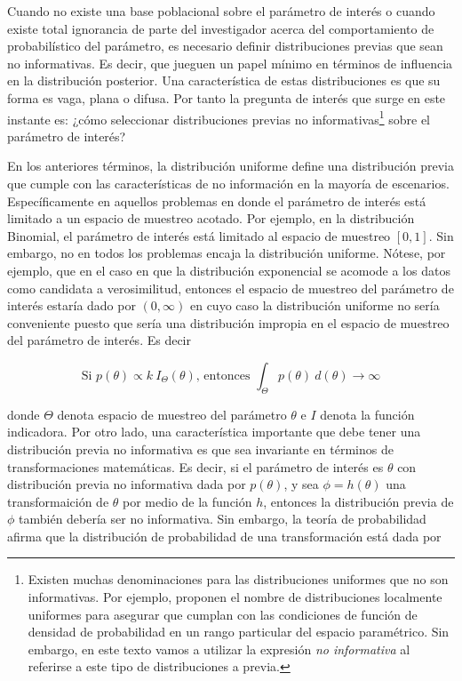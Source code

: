 \documentclass[
  10pt,
  spanish,
]{book}
\theoremstyle{definition}
\theoremstyle{definition}
\theoremstyle{definition}
\theoremstyle{definition}
\theoremstyle{remark}
\begin{document}
Cuando no existe una base poblacional sobre el parámetro de interés o
cuando existe total ignorancia de parte del investigador acerca del
comportamiento de probabilístico del parámetro, es necesario definir
distribuciones previas que sean no informativas. Es decir, que jueguen un papel mínimo en términos de
influencia en la distribución posterior. Una característica de
estas distribuciones es que su forma es vaga, plana o difusa.
Por tanto la pregunta de interés que surge en este instante es: ¿cómo
seleccionar distribuciones previas no
informativas\footnote{Existen muchas denominaciones para las distribuciones uniformes que no son informativas. Por ejemplo, \citet{BoxTiao} proponen el nombre de distribuciones localmente uniformes para asegurar que cumplan con las condiciones de función de densidad de probabilidad en un rango particular del espacio paramétrico. Sin embargo, en este texto vamos a utilizar la expresión \emph{no informativa} al referirse a este tipo de distribuciones a previa.}
sobre el parámetro de interés?

En los anteriores términos, la distribución uniforme define una
distribución previa que cumple con las características de no
información en la mayoría de escenarios. Específicamente en aquellos
problemas en donde el parámetro de interés está limitado a un espacio de
muestreo acotado. Por ejemplo, en la distribución Binomial, el parámetro
de interés está limitado al espacio de muestreo \([0,1]\). Sin embargo, no
en todos los problemas encaja la distribución uniforme. Nótese, por
ejemplo, que en el caso en que la distribución exponencial se acomode a
los datos como candidata a verosimilitud, entonces el espacio de
muestreo del parámetro de interés estaría dado por \((0,\infty)\) en cuyo
caso la distribución uniforme no sería conveniente puesto que sería una
distribución impropia en el espacio de muestreo del parámetro de
interés. Es decir

\begin{equation*}
\text{Si } p(\theta)\propto k\ I_{\Theta}(\theta) \text{, entonces } \int_{\Theta}p(\theta) \ d(\theta)\longrightarrow \infty
\end{equation*}

donde \(\Theta\) denota espacio de muestreo del parámetro \(\theta\) e \(I\)
denota la función indicadora. Por otro lado, una característica
importante que debe tener una distribución previa no informativa
es que sea invariante en términos de transformaciones matemáticas. Es
decir, si el parámetro de interés es \(\theta\) con distribución
previa no informativa dada por \(p(\theta)\), y sea
\(\phi=h(\theta)\) una transformaición de \(\theta\) por medio de la función
\(h\), entonces la distribución previa de \(\phi\) también debería
ser no informativa. Sin embargo, la teoría de probabilidad afirma que la
distribución de probabilidad de una transformación está dada por
\end{document}
